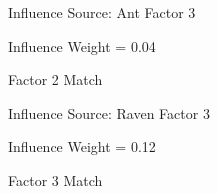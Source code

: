 \documentclass{article}
\begin{document}
\begin{figure}%
    \centering
    \qquad
    \caption{Factor 2 Match}%
    \label{fig:com2}%
    Influence Source: Ant Factor 3 
    \par Influence Weight = 0.04
\end{figure}

\begin{figure}%
    \centering
    \qquad
    \caption{Factor 3 Match}%
    \label{fig:com3}%
    Influence Source: Raven Factor 3 
    \par Influence Weight = 0.12
\end{figure}
\end{document}
